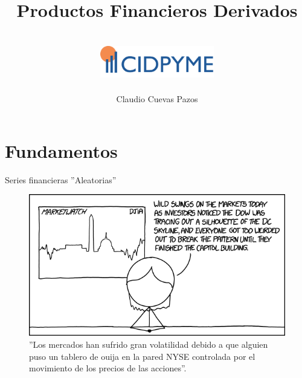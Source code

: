 \documentclass[11pt]{beamer}
\begin{document}
	\author[Claudio Cuevas Pazos]{\includegraphics[height=2.5cm,width=5cm]{logo}\\Claudio Cuevas Pazos}
	\title{Productos Financieros Derivados}
	\frame[plain]{\maketitle}

	
\begin{frame}{{}}
	\tableofcontents
\end{frame}


\section{Fundamentos}

\begin{frame}{Series financieras ''Aleatorias''}
	\begin{figure}
		\centering
		\includegraphics[width=.9\linewidth]{marketwatch}
		\caption{''Los mercados han sufrido gran volatilidad debido a que alguien puso un tablero de ouija en la pared NYSE controlada por el movimiento de los precios de las acciones''.}
		\label{fig:marketwatch}
	\end{figure}
	
\end{frame}
\end{document}
